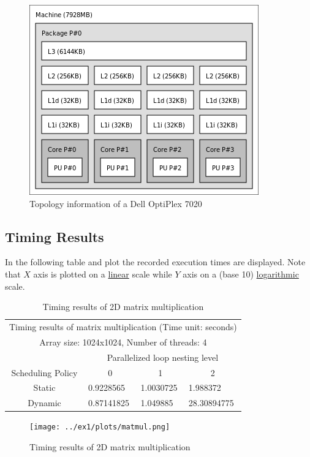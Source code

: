 \documentclass{article}
\begin{document}
\begin{figure}[htbp]
  \centering
  \includegraphics[width=0.5\columnwidth]{./opti7020-topo.png}
  \caption{Topology information of a Dell OptiPlex 7020}
\end{figure}

\pagebreak

\subsection{Timing Results}
In the following table and plot the recorded execution times are displayed.
Note that $X$ axis is plotted on a \underline{linear} scale while $Y$ axis on
a (base 10) \underline{logarithmic} scale.


\begin{table}[htbp]
  \centering
    \begin{tabular}{|c||l|l|l|} 
    \hline
    \multicolumn{4}{|c|}{Timing results of matrix multiplication (Time unit: seconds)} \\
    \multicolumn{4}{|c|}{Array size: 1024x1024, Number of threads: 4} \\
    \hline
    & \multicolumn{3}{|c|}{Parallelized loop nesting level} \\
    \hline
    Scheduling Policy  & \multicolumn{1}{|c|}{0} & \multicolumn{1}{|c|}{1} & \multicolumn{1}{|c|}{2} \\
    \hline\hline
    Static & 0.9228565 & 1.0030725 & 1.988372 \\
    \hline
    Dynamic & 0.87141825 & 1.049885 & 28.30894775 \\
    \hline
    \end{tabular}
  \caption{Timing results of 2D matrix multiplication}
\end{table}


\begin{figure}[htbp]
  \centering
  \texttt{[image: ../ex1/plots/matmul.png]}
  \caption{Timing results of 2D matrix multiplication}
\end{figure}
\end{document}
